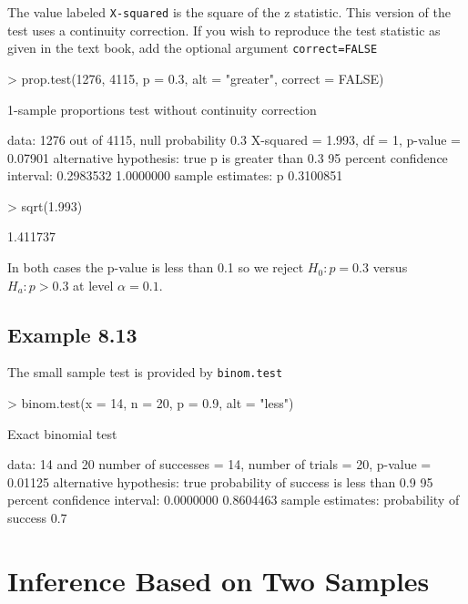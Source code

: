 \documentclass{book}
\begin{document}
The value labeled \texttt{X-squared} is the square of the z
statistic.  This version of the test uses a continuity correction.  If
you wish to reproduce the test statistic as given in the text book,
add the optional argument \texttt{correct=FALSE}
\begin{Schunk}
\begin{Sinput}
> prop.test(1276, 4115, p = 0.3, alt = "greater", correct = FALSE)
\end{Sinput}
\begin{Soutput}
	1-sample proportions test without continuity correction

data:  1276 out of 4115, null probability 0.3 
X-squared = 1.993, df = 1, p-value = 0.07901
alternative hypothesis: true p is greater than 0.3 
95 percent confidence interval:
 0.2983532 1.0000000 
sample estimates:
        p 
0.3100851 
\end{Soutput}
\begin{Sinput}
> sqrt(1.993)
\end{Sinput}
\begin{Soutput}
[1] 1.411737
\end{Soutput}
\end{Schunk}

In both cases the p-value is less than 0.1 so we reject $H_0:p=0.3$
versus $H_a:p>0.3$ at level $\alpha=0.1$.


\section{Example 8.13}
\label{sec:xmp0813}

The small sample test is provided by \texttt{binom.test}
\begin{Schunk}
\begin{Sinput}
> binom.test(x = 14, n = 20, p = 0.9, alt = "less")
\end{Sinput}
\begin{Soutput}
	Exact binomial test

data:  14 and 20 
number of successes = 14, number of trials = 20, p-value = 0.01125
alternative hypothesis: true probability of success is less than 0.9 
95 percent confidence interval:
 0.0000000 0.8604463 
sample estimates:
probability of success 
                   0.7 
\end{Soutput}
\end{Schunk}


\chapter{Inference Based on Two Samples}
\label{cha:twoSample}
\end{document}
